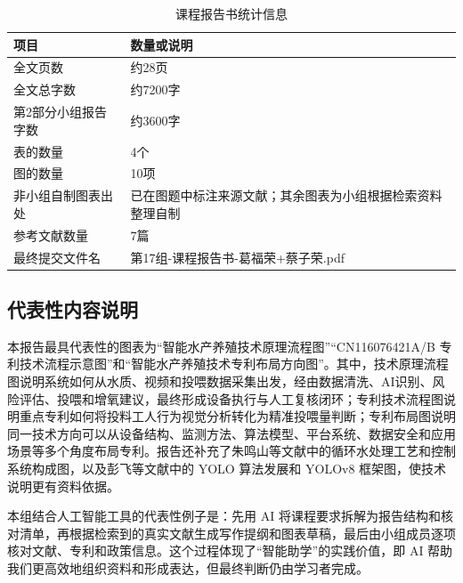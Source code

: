 \documentclass[UTF8,zihao=-4]{ctexart}
\begin{document}
	\begin{table}[H]
		\centering
		\caption{课程报告书统计信息}
		\begin{tabularx}{\textwidth}{lX}
			\toprule
			项目 & 数量或说明 \\
			\midrule
			全文页数 & 约28页 \\
			全文总字数 & 约7200字 \\
			第2部分小组报告字数 & 约3600字 \\
			表的数量 & 4个 \\
			图的数量 & 10项 \\
			非小组自制图表出处 & 已在图题中标注来源文献；其余图表为小组根据检索资料整理自制 \\
			参考文献数量 & 7篇 \\
			最终提交文件名 & 第17组-课程报告书-葛福荣+蔡子荣.pdf \\
			\bottomrule
		\end{tabularx}
	\end{table}
	
	\subsection*{代表性内容说明}
	
	本报告最具代表性的图表为“智能水产养殖技术原理流程图”“CN116076421A/B 专利技术流程示意图”和“智能水产养殖技术专利布局方向图”。其中，技术原理流程图说明系统如何从水质、视频和投喂数据采集出发，经由数据清洗、AI识别、风险评估、投喂和增氧建议，最终形成设备执行与人工复核闭环；专利技术流程图说明重点专利如何将投料工人行为视觉分析转化为精准投喂量判断；专利布局图说明同一技术方向可以从设备结构、监测方法、算法模型、平台系统、数据安全和应用场景等多个角度布局专利。报告还补充了朱鸣山等文献中的循环水处理工艺和控制系统构成图，以及彭飞等文献中的 YOLO 算法发展和 YOLOv8 框架图，使技术说明更有资料依据。
	
	本组结合人工智能工具的代表性例子是：先用 AI 将课程要求拆解为报告结构和核对清单，再根据检索到的真实文献生成写作提纲和图表草稿，最后由小组成员逐项核对文献、专利和政策信息。这个过程体现了“智能助学”的实践价值，即 AI 帮助我们更高效地组织资料和形成表达，但最终判断仍由学习者完成。
	
\end{document}
